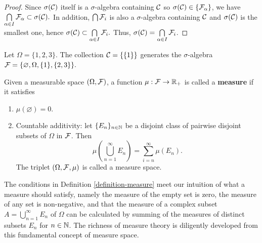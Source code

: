 \begin{proof}
  Since $\sigma(\mathcal{C})$ itself is a $\sigma$-algebra containing $\mathcal{C}$ so $\sigma(\mathcal{C})\in\{\mathcal{F}_\alpha\}$, we have $\bigcap\limits_{\alpha\in I}\mathcal{F}_\alpha\subset \sigma(\mathcal{C}).$ In addition, $\bigcap\mathcal{F}_i$ is also a $\sigma$-algebra containing $\mathcal{C}$ and $\sigma(\mathcal{C})$ is the smallest one, hence $\sigma(\mathcal{C})\subset\bigcap\limits_{\alpha\in I}\mathcal{F}_i.$ Thus, $\sigma(\mathcal{C})=\bigcap\limits_{\alpha\in I}\mathcal{F}_i$.
\end{proof}

\begin{example}
  Let $\Omega=\{1,2,3\}$. The collection $\mathcal{C}=\{\{1\}\}$ generates the $\sigma$-algebra $\mathcal{F}=\{\varnothing,\Omega,\{1\},\{2,3\}\}.$
\end{example}

\begin{definition}
  \label{definition-measure}
  Given a measurable space $(\Omega,\mathcal{F})$, a function $\mu:\mathcal{F}\to\mathbb{R}_+$ is called a \textbf{measure} if it satisfies
  \begin{enumerate}
    \item $\mu(\varnothing)=0$.
    \item Countable additivity: let $\{E_n\}_{n\in \mathbb{N}}$ be a disjoint class of pairwise disjoint subsets of $\Omega$ in $\mathcal{F}$. Then
          \begin{equation}
            \mu\left(\bigcup\limits_{n=1}^\infty E_n\right)=\sum\limits_{i=n}^\infty \mu(E_n).
          \end{equation}
          The triplet $(\Omega,\mathcal{F},\mu)$ is called a measure space.
  \end{enumerate}
\end{definition}

The conditions in Definition \ref{definition-measure} meet our intuition of what a measure should satisfy, namely the measure of the empty set is zero, the measure of any set is non-negative, and that the measure of a complex subset $A = \bigcup\limits_{n=1}^\infty E_n$ of $\Omega$ can be calculated by summing of the measures of distinct subsets $E_n$ for $n\in\mathbb{N}$. The richness of measure theory is diligently developed from this fundamental concept of measure space.


